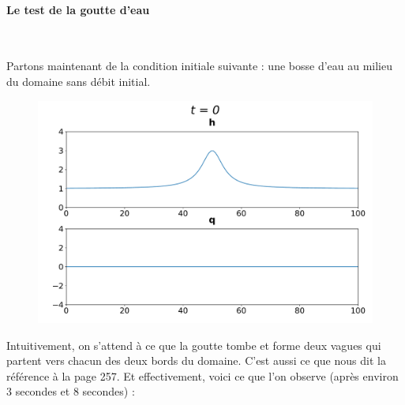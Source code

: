\documentclass[
11pt, %
francais, %
singlespacing, %
headsepline, %
]{MastersDoctoralThesis} %
\begin{document}
\paragraph{Le test de la goutte d'eau} \

Partons maintenant de la condition initiale suivante : une bosse d'eau au milieu du domaine sans débit initial.

\begin{figure}
\centering
\includegraphics[scale = .7]{"bosse0"}
\end{figure}

Intuitivement, on s'attend à ce que la \og goutte \fg{} tombe et forme deux vagues qui partent vers chacun des deux bords du domaine.
C'est aussi ce que nous dit la référence \cite{RL} à la page 257. Et effectivement, voici ce que l'on observe (après environ 3 secondes et 8 secondes) :
\end{document}
